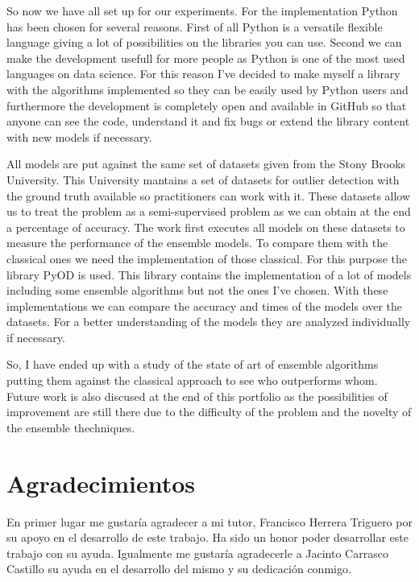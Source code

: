 So now we have all set up for our experiments. For the implementation Python has been chosen for several reasons. First of all Python is a versatile flexible language giving a lot of possibilities on the libraries you can use. Second we can make the development usefull for more people as Python is one of the most used languages on data science. For this reason I've decided to make myself a library with the algorithms implemented so they can be easily used by Python users and furthermore the development is completely open and available in GitHub so that anyone can see the code, understand it and fix bugs or extend the library content with new models if necessary.

All models are put against the same set of datasets given from the Stony Brooks University. This University mantains a set of datasets for outlier detection with the ground truth available so practitioners can work with it. These datasets allow us to treat the problem as a semi-supervised problem as we can obtain at the end a percentage of accuracy. The work first executes all models on these datasets to measure the performance of the ensemble models. To compare them with the classical ones we need the implementation of those classical. For this purpose the library PyOD is used. This library contains the implementation of a lot of models including some ensemble algorithms but not the ones I've chosen. With these implementations we can compare the accuracy and times of the models over the datasets. For a better understanding of the models they are analyzed individually if necessary.

So, I have ended up with a study of the state of art of ensemble algorithms putting them against the classical approach to see who outperforms whom. Future work is also discused at the end of this portfolio as the possibilities of improvement are still there due to the difficulty of the problem and the novelty of the ensemble thechniques.

\chapter*{Agradecimientos}
\thispagestyle{empty}

En primer lugar me gustaría agradecer a mi tutor, Francisco Herrera Triguero por su apoyo en el desarrollo de este trabajo. Ha sido un honor poder desarrollar este trabajo con su ayuda. Igualmente me gustaría agradecerle a Jacinto Carrasco Castillo su ayuda en el desarrollo del mismo y su dedicación conmigo.

